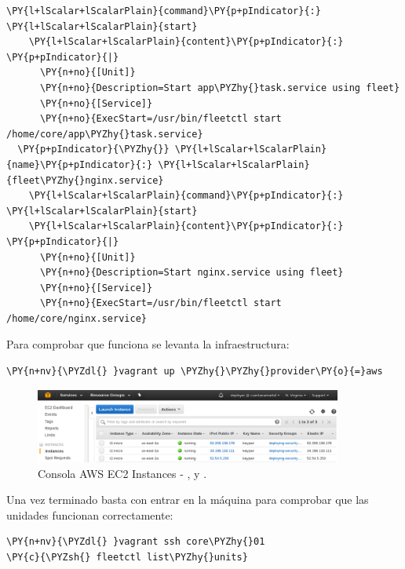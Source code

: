 \begin{codelisting}
\begin{Verbatim}[fontsize=\relsize{-2.5},fontseries=b,commandchars=\\\{\}]
    \PY{l+lScalar+lScalarPlain}{command}\PY{p+pIndicator}{:} \PY{l+lScalar+lScalarPlain}{start}
    \PY{l+lScalar+lScalarPlain}{content}\PY{p+pIndicator}{:} \PY{p+pIndicator}{|}
      \PY{n+no}{[Unit]}
      \PY{n+no}{Description=Start app\PYZhy{}task.service using fleet}
      \PY{n+no}{[Service]}
      \PY{n+no}{ExecStart=/usr/bin/fleetctl start /home/core/app\PYZhy{}task.service}
  \PY{p+pIndicator}{\PYZhy{}} \PY{l+lScalar+lScalarPlain}{name}\PY{p+pIndicator}{:} \PY{l+lScalar+lScalarPlain}{fleet\PYZhy{}nginx.service}
    \PY{l+lScalar+lScalarPlain}{command}\PY{p+pIndicator}{:} \PY{l+lScalar+lScalarPlain}{start}
    \PY{l+lScalar+lScalarPlain}{content}\PY{p+pIndicator}{:} \PY{p+pIndicator}{|}
      \PY{n+no}{[Unit]}
      \PY{n+no}{Description=Start nginx.service using fleet}
      \PY{n+no}{[Service]}
      \PY{n+no}{ExecStart=/usr/bin/fleetctl start /home/core/nginx.service}
\end{Verbatim}
\end{codelisting}

Para comprobar que funciona se levanta la infraestructura:

\begin{framed_shaded}
\begin{Verbatim}[fontsize=\relsize{-2.5},fontseries=b,commandchars=\\\{\}]
\PY{n+nv}{\PYZdl{} }vagrant up \PYZhy{}\PYZhy{}provider\PY{o}{=}aws
\end{Verbatim}
\end{framed_shaded}

\begin{figure}[H]
\centering
\includegraphics[width=0.9\textwidth]{images/figures/aws-console-fleet.png}
\caption{Consola AWS EC2 Instances - ,  y .}
\end{figure}

Una vez terminado basta con entrar en la máquina  para comprobar que las unidades funcionan correctamente:

\begin{framed_shaded}
\begin{Verbatim}[fontsize=\relsize{-2.5},fontseries=b,commandchars=\\\{\}]
\PY{n+nv}{\PYZdl{} }vagrant ssh core\PYZhy{}01
\PY{c}{\PYZsh{} fleetctl list\PYZhy{}units}
\end{Verbatim}
\end{framed_shaded}


